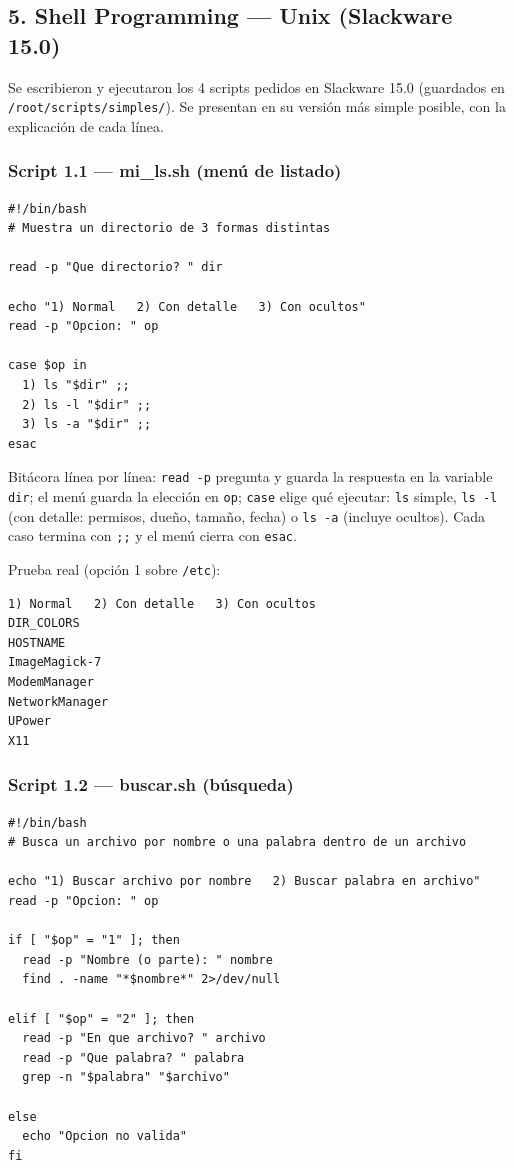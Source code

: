 \subsection{5. Shell Programming --- Unix (Slackware 15.0)}

Se escribieron y ejecutaron los 4 scripts pedidos en Slackware 15.0 (guardados en \texttt{/root/scripts/simples/}). Se presentan en su versión más simple posible, con la explicación de cada línea.

\subsubsection{Script 1.1 --- mi\_ls.sh (menú de listado)}

\begin{lstlisting}
#!/bin/bash
# Muestra un directorio de 3 formas distintas

read -p "Que directorio? " dir

echo "1) Normal   2) Con detalle   3) Con ocultos"
read -p "Opcion: " op

case $op in
  1) ls "$dir" ;;
  2) ls -l "$dir" ;;
  3) ls -a "$dir" ;;
esac
\end{lstlisting}

Bitácora línea por línea: \texttt{read -p} pregunta y guarda la respuesta en la variable \texttt{dir}; el menú guarda la elección en \texttt{op}; \texttt{case} elige qué ejecutar: \texttt{ls} simple, \texttt{ls -l} (con detalle: permisos, dueño, tamaño, fecha) o \texttt{ls -a} (incluye ocultos). Cada caso termina con \texttt{;;} y el menú cierra con \texttt{esac}.

Prueba real (opción 1 sobre \texttt{/etc}):

\begin{lstlisting}
1) Normal   2) Con detalle   3) Con ocultos
DIR_COLORS
HOSTNAME
ImageMagick-7
ModemManager
NetworkManager
UPower
X11
\end{lstlisting}

\subsubsection{Script 1.2 --- buscar.sh (búsqueda)}

\begin{lstlisting}
#!/bin/bash
# Busca un archivo por nombre o una palabra dentro de un archivo

echo "1) Buscar archivo por nombre   2) Buscar palabra en archivo"
read -p "Opcion: " op

if [ "$op" = "1" ]; then
  read -p "Nombre (o parte): " nombre
  find . -name "*$nombre*" 2>/dev/null

elif [ "$op" = "2" ]; then
  read -p "En que archivo? " archivo
  read -p "Que palabra? " palabra
  grep -n "$palabra" "$archivo"

else
  echo "Opcion no valida"
fi
\end{lstlisting}

